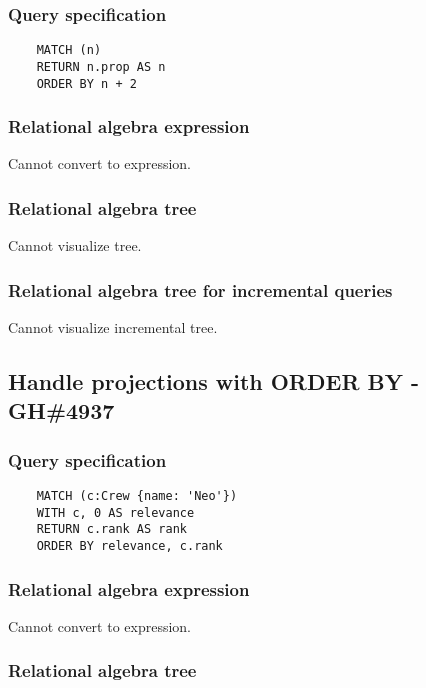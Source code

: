 	\subsubsection*{Query specification}

	\begin{lstlisting}
	MATCH (n)
	RETURN n.prop AS n
	ORDER BY n + 2
	\end{lstlisting}


	\subsubsection*{Relational algebra expression}

	Cannot convert to expression.

	\subsubsection*{Relational algebra tree}

	Cannot visualize tree.

	\subsubsection*{Relational algebra tree for incremental queries}

	Cannot visualize incremental tree.
	\subsection{Handle projections with ORDER BY - GH\#4937}

	\subsubsection*{Query specification}

	\begin{lstlisting}
	MATCH (c:Crew {name: 'Neo'})
	WITH c, 0 AS relevance
	RETURN c.rank AS rank
	ORDER BY relevance, c.rank
	\end{lstlisting}


	\subsubsection*{Relational algebra expression}

	Cannot convert to expression.

	\subsubsection*{Relational algebra tree}

